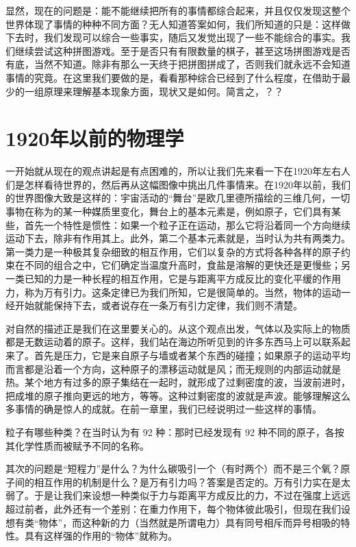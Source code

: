 \documentclass[12pt,oneside]{book}
\begin{document}
显然，现在的问题是：能不能继续把所有的事情都综合起来，并且仅仅发现这整个世界体现了事情的种种不同方面？无人知道答案如何，我们所知道的只是：这样做下去时，我们发现可以综合一些事实，随后又发觉出现了一些不能综合的事实。我们继续尝试这种拼图游戏。至于是否只有有限数量的棋子，甚至这场拼图游戏是否有底，当然不知道。除非有那么一天终于把拼图拼成了，否则我们就永远不会知道事情的究竟。在这里我们要做的是，看看那种综合已经到了什么程度，在借助于最少的一组原理来理解基本现象方面，现状又是如何。简言之，？？

\section{1920年以前的物理学}
一开始就从现在的观点讲起是有点困难的，所以让我们先来看一下在1920年左右人们是怎样看待世界的，然后再从这幅图像中挑出几件事情来。在1920年以前，我们的世界图像大致是这样的：宇宙活动的“舞台”是欧几里德所描绘的三维几何，一切事物在称为的某一种媒质里变化，舞台上的基本元素是，例如原子，它们具有某些，首先一个特性是惯性：如果一个粒子正在运动，那么它将沿着同一个方向继续运动下去，除非有作用其上。此外，第二个基本元素就是，当时认为共有两类力。第一类力是一种极其复杂细致的相互作用，它们以复杂的方式将各种各样的原子约束在不同的组合之中，它们确定当温度升高时，食盐是溶解的更快还是更慢些；另一类已知的力是一种长程的相互作用，它是与距离平方成反比的变化平缓的作用力，称为万有引力。这条定律已为我们所知，它是很简单的。当然，物体的运动一经开始就能保持下去，或者说存在一条万有引力定律，我们则不清楚。

对自然的描述正是我们在这里要关心的。从这个观点出发，气体以及实际上的物质都是无数运动着的原子。这样，我们站在海边所听见到的许多东西马上可以联系起来了。首先是压力，它是来自原子与墙或者某个东西的碰撞；如果原子的运动平均而言都是沿着一个方向，这种原子的漂移运动就是风；而无规则的内部运动就是热。某个地方有过多的原子集结在一起时，就形成了过剩密度的波，当波前进时，把成堆的原子推向更远的地方，等等。这种过剩密度的波就是声波。能够理解这么多事情的确是惊人的成就。在前一章里，我们已经说明过一些这样的事情。

粒子有哪些种类？在当时认为有 92 种：那时已经发现有 92 种不同的原子，各按其化学性质而被赋予不同的名称。

其次的问题是“短程力”是什么？为什么碳吸引一个（有时两个）而不是三个氧？原子间的相互作用的机制是什么？是万有引力吗？答案是否定的。万有引力实在是太弱了。于是让我们来设想一种类似于力与距离平方成反比的力，不过在强度上远远超过前者，此外还有一个差别：在重力作用下，每个物体彼此吸引，但现在我们设想有类“物体”，而这种新的力（当然就是所谓电力）具有同号相斥而异号相吸的特性。具有这样强的作用的“物体”就称为。
\end{document}
